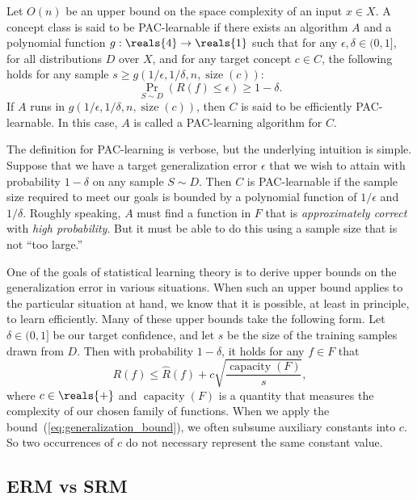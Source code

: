 \documentclass[11pt,a4paper]{article}
\numberwithin{equation}{section}
\newcommand{\size}{\operatorname{size}}
\newcommand{\capacity}{\operatorname{capacity}}
\begin{document}
\begin{definition}
Let $O(n)$ be an upper bound on the space complexity of an input $x \in X$. A
concept class is said to be PAC-learnable if there exists an algorithm $A$ and a
polynomial function $g : \reals{4} \to \reals{1}$ such that for any $\epsilon,
\delta \in (0, 1]$, for all distributions $D$ over $X$, and for any target
concept $c \in C$, the following holds for any sample $s \geq g(1/\epsilon,
1/\delta, n, \size(c))$:
\[
	\Pr_{S \sim D} (R(f) \leq \epsilon) \geq 1 - \delta.
\]
If $A$ runs in $g(1/\epsilon, 1/\delta, n, \size(c))$, then $C$ is said to be
efficiently PAC-learnable. In this case, $A$ is called a PAC-learning algorithm
for $C$.
\end{definition}

The definition for PAC-learning is verbose, but the underlying intuition is
simple. Suppose that we have a target generalization error $\epsilon$ that we
wish to attain with probability $1 - \delta$ on any sample $S \sim D$. Then $C$
is PAC-learnable if the sample size required to meet our goals is bounded by a
polynomial function of $1/\epsilon$ and $1/\delta$. Roughly speaking, $A$ must
find a function in $F$ that is \emph{approximately correct} with \emph{high
probability}. But it must be able to do this using a sample size that is not
``too large.''

One of the goals of statistical learning theory is to derive upper bounds on the
generalization error in various situations. When such an upper bound applies to
the particular situation at hand, we know that it is possible, at least in
principle, to learn efficiently. Many of these upper bounds take the following
form. Let $\delta \in (0, 1]$ be our target confidence, and let $s$ be the size
of the training samples drawn from $D$. Then with probability $1 - \delta$, it
holds for any $f \in F$ that
\begin{equation}
	R(f) \leq \hat{R}(f) + c \sqrt{\frac{\capacity(F)}{s}},
	\label{eq:generalization_bound}
\end{equation}
where $c \in \reals{+}$ and $\capacity(F)$ is a quantity that measures the
complexity of our chosen family of functions. When we apply the
bound~(\ref{eq:generalization_bound}), we often subsume auxiliary constants into
$c$. So two occurrences of $c$ do not necessary represent the same constant
value.

\subsection{ERM vs SRM}
\end{document}
